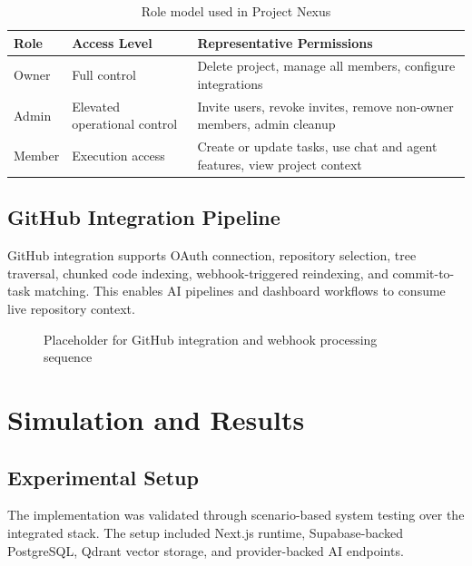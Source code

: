 \documentclass[a4paper, 11pt, oneside]{Dissertation}
\begin{document}
\begin{table}[H]
\centering
\begin{tabular}{|L{2.8cm}|L{3.4cm}|L{5.1cm}|}
\hline
\textbf{Role} & \textbf{Access Level} & \textbf{Representative Permissions} \\
\hline
Owner & Full control & Delete project, manage all members, configure integrations \\
\hline
Admin & Elevated operational control & Invite users, revoke invites, remove non-owner members, admin cleanup \\
\hline
Member & Execution access & Create or update tasks, use chat and agent features, view project context \\
\hline
\end{tabular}
\caption{Role model used in Project Nexus}
\label{tab:role-model}
\end{table}

\FloatBarrier

\section{GitHub Integration Pipeline}
GitHub integration supports OAuth connection, repository selection, tree traversal, chunked code indexing, webhook-triggered reindexing, and commit-to-task matching. This enables AI pipelines and dashboard workflows to consume live repository context.

\begin{figure}[H]
\centering
{}
\caption{Placeholder for GitHub integration and webhook processing sequence}
\label{fig:github-sequence}
\end{figure}

\FloatBarrier

\chapter{Simulation and Results}
\label{ch:result}

\section{Experimental Setup}
The implementation was validated through scenario-based system testing over the integrated stack. The setup included Next.js runtime, Supabase-backed PostgreSQL, Qdrant vector storage, and provider-backed AI endpoints.
\end{document}
